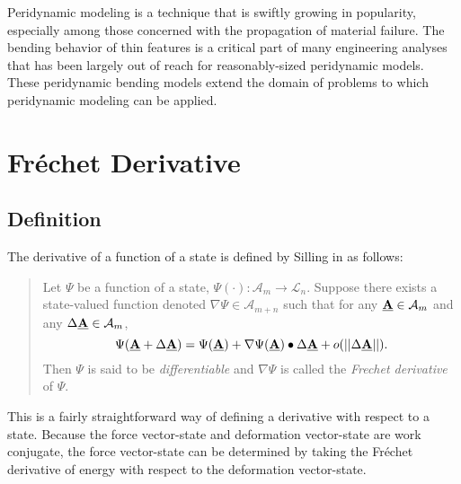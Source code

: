 Peridynamic modeling is a technique that is swiftly growing in popularity, especially among those concerned with the propagation of material failure.
The bending behavior of thin features is a critical part of many engineering analyses that has been largely out of reach for reasonably-sized peridynamic models. 
These peridynamic bending models extend the domain of problems to which peridynamic modeling can be applied. 

\appendix
\chapter{Fr\'echet Derivative}
\label{sec:frechet}
\section{Definition}
The derivative of a function of a state is defined by Silling in \cite{silling2007peridynamic} as follows:
\begin{quote}
Let $\Psi$ be a function of a state, $\Psi(\cdot):\mathcal{A}_m\rightarrow\mathcal{L}_n$. Suppose there exists a state-valued function denoted $\nabla\Psi\in\mathcal{A}_{m+n}$ such that for any $\vstate{A}{}{}\in\mathcal{A}_m$ and any $\Delta\vstate{A}{}{}\in\mathcal{A}_m$,
\begin{equation}
  \Psi(\vstate{A}{}{}+\Delta\vstate{A}{}{})=\Psi(\vstate{A}{}{})+\nabla\Psi(\vstate{A}{}{})\bullet\Delta\vstate{A}{}{}+o(||\Delta\vstate{A}{}{}||).
\end{equation}
Then $\Psi$ is said to be \textit{differentiable} and $\nabla\Psi$ is called the \textit{Frechet derivative} of $\Psi$.
\end{quote}
This is a fairly straightforward way of defining a derivative with respect to a state.
Because the force vector-state and deformation vector-state are work conjugate, the force vector-state can be determined by taking the Fr\'echet derivative of energy with respect to the deformation vector-state.
